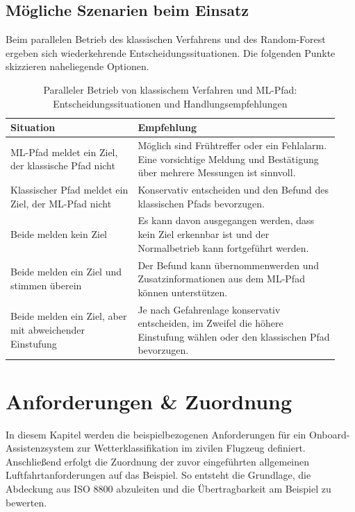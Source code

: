 \section{Mögliche Szenarien beim Einsatz}
Beim parallelen Betrieb des klassischen Verfahrens und des Random-Forest ergeben sich wiederkehrende Entscheidungssituationen.
Die folgenden Punkte skizzieren naheliegende Optionen.


\begin{table}[h]
\centering
\renewcommand{\arraystretch}{1.12}
\begin{tabular}{p{0.36\linewidth} p{0.58\linewidth}}
\toprule
\textbf{Situation} & \textbf{Empfehlung} \\
\midrule
ML-Pfad meldet ein Ziel, der klassische Pfad nicht &
Möglich sind Frühtreffer oder ein Fehlalarm. Eine vorsichtige Meldung und Bestätigung über mehrere Messungen ist sinnvoll. \\
\addlinespace[4pt]
Klassischer Pfad meldet ein Ziel, der ML-Pfad nicht &
Konservativ entscheiden und den Befund des klassischen Pfads bevorzugen. \\
\addlinespace[4pt]
Beide melden kein Ziel &
Es kann davon ausgegangen werden, dass kein Ziel erkennbar ist und der Normalbetrieb kann fortgeführt werden. \\
\addlinespace[4pt]
Beide melden ein Ziel und stimmen überein &
Der Befund kann übernommenwerden und Zusatzinformationen aus dem ML-Pfad können unterstützen. \\
\addlinespace[4pt]
Beide melden ein Ziel, aber mit abweichender Einstufung &
Je nach Gefahrenlage konservativ entscheiden, im Zweifel die höhere Einstufung wählen oder den klassischen Pfad bevorzugen. \\
\bottomrule
\end{tabular}
\caption{Paralleler Betrieb von klassischem Verfahren und ML-Pfad: Entscheidungssituationen und Handlungsempfehlungen}
\end{table}






\chapter{Anforderungen \& Zuordnung}\label{chap:anforderungen}
In diesem Kapitel werden die beispielbezogenen Anforderungen für ein 
Onboard-Assistenzsystem zur Wetterklassifikation im zivilen Flugzeug definiert. 
Anschließend erfolgt die Zuordnung der zuvor eingeführten allgemeinen Luftfahrtanforderungen auf das Beispiel. 
So entsteht die Grundlage, die Abdeckung aus ISO 8800 abzuleiten und die Übertragbarkeit am Beispiel zu bewerten.


